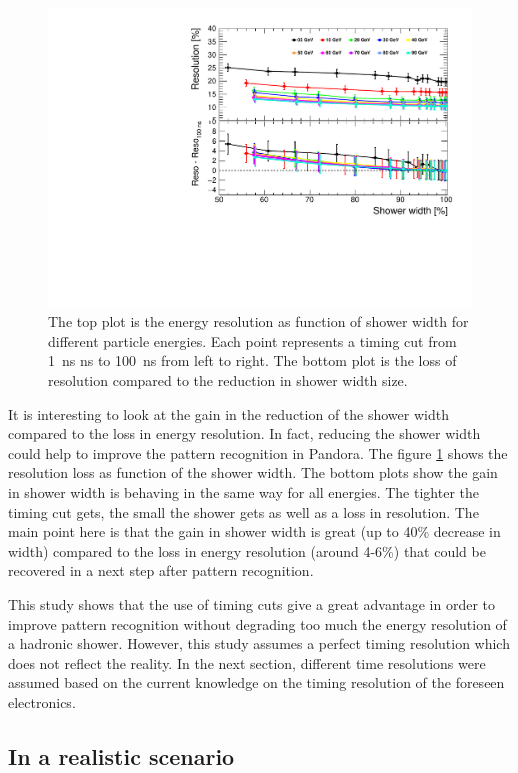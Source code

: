 \begin{figure}[htbp!]
  \centering
  \includegraphics[width=0.7\linewidth]{../Thesis_Plots/ILD/NoSmearing/Plots/ShowerWidth_Resolution_noSmearing}
  \caption{The top plot is the energy resolution as function of shower width for different particle energies. Each point represents a timing cut from \SI{1}{\nano\second} ns to \SI{100}{\nano\second} from left to right. The bottom plot is the loss of resolution compared to the reduction in shower width size.} \label{fig:ShowerWidthResoNoSmearing}
\end{figure}

It is interesting to look at the gain in the reduction of the shower width compared to the loss in energy resolution. In fact, reducing the shower width could help to improve the pattern recognition in Pandora. The figure \ref{fig:ShowerWidthResoNoSmearing} shows the resolution loss as function of the shower width. The bottom plots show the gain in shower width is behaving in the same way for all energies. The tighter the timing cut gets, the small the shower gets as well as a loss in resolution. The main point here is that the gain in shower width is great (up to 40\% decrease in width) compared to the loss in energy resolution (around 4-6\%) that could be recovered in a next step after pattern recognition.

This study shows that the use of timing cuts give a great advantage in order to improve pattern recognition without degrading too much the energy resolution of a hadronic shower. However, this study assumes a perfect timing resolution which does not reflect the reality. In the next section, different time resolutions were assumed based on the current knowledge on the timing resolution of the foreseen electronics.

\subsection{In a realistic scenario}
\label{sec:RealisticScenario}

